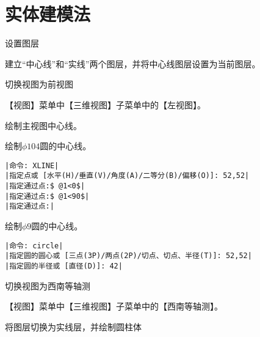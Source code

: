 \section{实体建模法}
\begin{procedure}
\item 设置图层

建立“中心线”和“实线”两个图层，并将中心线图层设置为当前图层。
\item 切换视图为前视图

【视图】菜单中【三维视图】子菜单中的【左视图】。
\item 绘制主视图中心线。

绘制$\phi 104$圆的中心线。
\begin{lstlisting}
|命令: XLINE|
|指定点或 [水平(H)/垂直(V)/角度(A)/二等分(B)/偏移(O)]: 52,52|
|指定通过点:$ @1<0$|
|指定通过点:$ @1<90$|
|指定通过点:|
\end{lstlisting}
绘制$\phi 9$圆的中心线。
\begin{lstlisting}
|命令: circle|
|指定圆的圆心或 [三点(3P)/两点(2P)/切点、切点、半径(T)]: 52,52|
|指定圆的半径或 [直径(D)]: 42|
\end{lstlisting}
\item 切换视图为西南等轴测

【视图】菜单中【三维视图】子菜单中的【西南等轴测】。
\item 将图层切换为实线层，并绘制圆柱体


\end{procedure}
